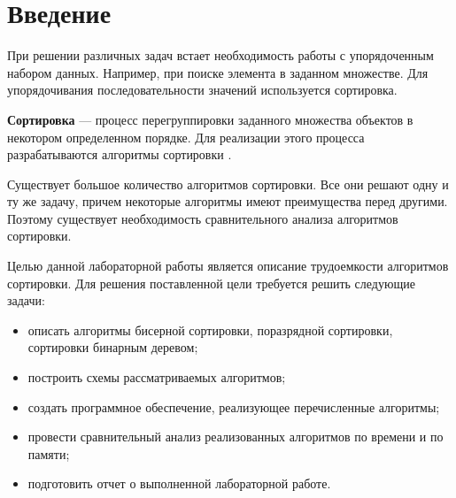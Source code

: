 \chapter*{Введение}

При решении различных задач встает необходимость работы с упорядоченным набором данных. Например, при поиске элемента в заданном множестве.
Для упорядочивания последовательности значений используется сортировка.

\textbf{Сортировка} --- процесс перегруппировки заданного множества объектов в некотором определенном порядке.
Для реализации этого процесса разрабатываются алгоритмы сортировки \cite{def}. 

Существует большое количество алгоритмов сортировки.
Все они решают одну и ту же задачу, причем некоторые алгоритмы имеют преимущества перед другими.
Поэтому существует необходимость сравнительного анализа алгоритмов сортировки. 

Целью данной лабораторной работы является описание трудоемкости алгоритмов сортировки.
Для решения поставленной цели требуется решить следующие задачи:

\begin{itemize}
	\item описать алгоритмы бисерной сортировки, поразрядной сортировки, сортировки бинарным деревом;
	\item построить схемы рассматриваемых алгоритмов;
	\item создать программное обеспечение, реализующее перечисленные алгоритмы;
	\item провести сравнительный анализ реализованных алгоритмов по времени и по памяти;
	\item подготовить отчет о выполненной лабораторной работе.
\end{itemize}
